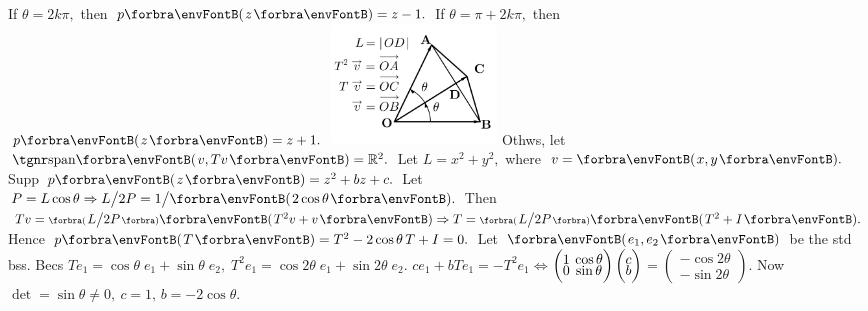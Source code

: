 If $\theta=2k\pi,$ then $p\Par{z}=z-1.$ If $\theta=\pi+2k\pi,$ then $p\Par{z}=z+1.$\vspace{-28pt}\parSol{}
\hfill\includegraphics[width=4.4cm,height=3.2cm,scale=0.22]{diagram5BI-1.png}\vspace{-68pt}\parSol{}
Othws, let $\Span{v,Tv}=\Rbb^2.$ Let $L=x^2+y^2,$ where $v=\Par{x,y}.$\parSol{}
Supp $p\Par{z}=z^2+bz+c.$ Let $P=L\cos\theta\Rightarrow L\big/2P=1\big/\Par{2\cos\theta}.$\vspace{2pt}\parSol{}
Then $Tv=\BigPar{L\big/2P}\Par{T^2 v+v}\Rightarrow T=\BigPar{L\big/2P}\Par{T^2+I}.$\parSol{}
Hence $p\Par{T}=T^2-2\cos\theta\, T+I=0.$\PfEnd\vspace{2pt}\parSol{}
\Or Let $\Par{e_1,e_2}$ be the std bss. Becs $Te_1=\cos\theta\;e_1+\sin\theta\;e_2,\;T^2e_1=\cos2\theta\;e_1+\sin2\theta\;e_2.$\vspace{0pt}\parSol{}
$ce_1+bTe_1=-T^2 e_1\Longleftrightarrow{}${\small$\begin{pmatrix}1 &\hspace{-6pt} \cos\theta\\[-4pt]0 &\hspace{-6pt} \sin\theta\end{pmatrix}\begin{pmatrix}c \\[-4pt] b\end{pmatrix}$}${}={}${\small$\begin{pmatrix}-\cos2\theta\\[-4pt]-\sin2\theta\end{pmatrix}$}. Now $\det=\sin\theta\neq 0,\:c=1,\,b=-2\cos\theta.$\PfEnd%
\SepLine
		
